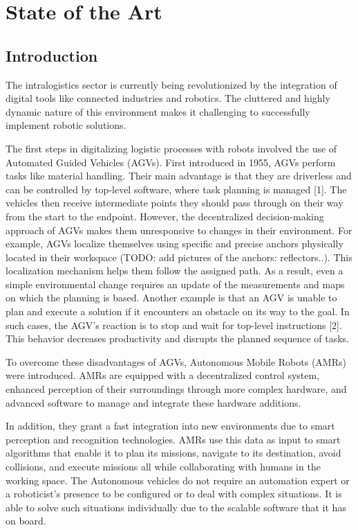 \chapter{State of the Art}

\renewcommand{\chaptername}{Chapter}

\section*{Introduction}

The intralogistics sector is currently being revolutionized by the integration of 
digital tools like connected industries and robotics. The cluttered and highly dynamic 
nature of this environment makes it challenging to successfully implement robotic 
solutions.

The first steps in digitalizing logistic processes with robots involved the use of 
Automated Guided Vehicles (AGVs). First introduced in 1955, AGVs perform tasks like 
material handling. Their main advantage is that they are driverless and can be 
controlled by top-level software, where task planning is managed [1]. The vehicles 
then receive intermediate points they should pass through on their way from the start 
to the endpoint. However, the decentralized decision-making approach of AGVs makes them 
unresponsive to changes in their environment. For example, AGVs localize themselves 
using specific and precise anchors physically located in their workspace 
(TODO: add pictures of the anchors: reflectors..). 
This localization mechanism helps them follow the assigned path. As a result, even 
a simple environmental change requires an update of the measurements and maps on 
which the planning is based. Another example is that an AGV is unable to plan and 
execute a solution if it encounters an obstacle on its way to the goal. In such cases, 
the AGV’s reaction is to stop and wait for top-level instructions [2]. This behavior 
decreases productivity and disrupts the planned sequence of tasks.

To overcome these disadvantages of AGVs, Autonomous Mobile Robots (AMRs) were introduced. 
AMRs are equipped with a decentralized control system, enhanced perception of their 
surroundings through more complex hardware, and advanced software to manage and integrate 
these hardware additions.

In addition, they grant a fast integration into new environments due to smart perception 
and recognition technologies. AMRs use this data as input to smart algorithms that 
enable it to plan its missions, navigate to its destination, avoid collisions, and 
execute missions all while collaborating with humans in the working space. The 
Autonomous vehicles do not require an automation expert or a roboticist’s presence to 
be configured or to deal with complex situations. It is able to solve such situations 
individually due to the scalable software that it has on board.

